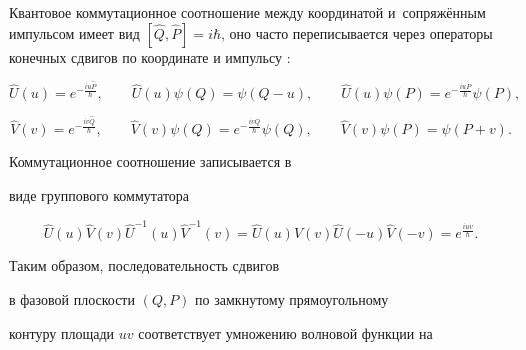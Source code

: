 




\maketitle






 Квантовое коммутационное соотношение между координатой и~сопряжённым импульсом имеет вид $[\hat Q, \hat P]=i\hbar$,  оно часто переписывается через операторы конечных сдвигов по координате и импульсу \cite{ivanovmg:bib:Weyl,ivanovmg:bib:Faddeev}:

\begin{equation}\label{Uu}

  \hat U(u)=e^{-\frac{iu\hat P}\hbar},\qquad

  \hat U(u)\psi(Q)=\psi(Q-u),\qquad

  \hat U(u)\psi(P)=e^{-\frac{iuP}\hbar}\psi(P),

\end{equation}

\begin{equation}\label{Vv}

  \hat V(v)=e^{-\frac{iv\hat Q}\hbar},\qquad

  \hat V(v)\psi(Q)=e^{-\frac{ivQ}\hbar}\psi(Q),\qquad

  \hat V(v)\psi(P)=\psi(P+v).

\end{equation}

  Коммутационное соотношение записывается в

  виде группового коммутатора

\begin{equation}\label{UVUV}

  \hat U(u)\hat V(v)\hat U^{-1}(u)\hat V^{-1}(v)=

  \hat U(u)\hat V(v)\hat U(-u)\hat V(-v)=

  e^{\frac{iuv}\hbar}.

\end{equation}



  Таким образом, последовательность сдвигов

  в фазовой плоскости $(Q,P)$ по замкнутому прямоугольному

  контуру площади $uv$ соответствует умножению волновой функции на

